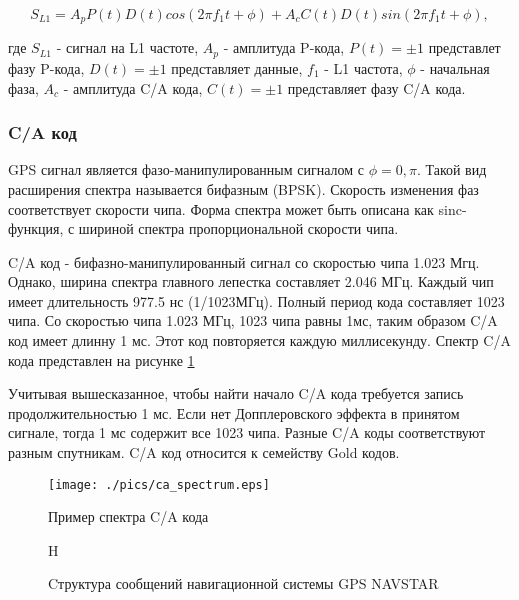 \begin{equation}
S_{L1}=A_p P(t) D(t) cos(2\pi f_1 t + \phi) + A_c C(t) D(t) sin(2\pi f_1 t + \phi),
\label{eq:l2_freq}
\end{equation}

где ${S_{L1}}$ - сигнал на L1 частоте, ${A_p}$ - амплитуда P-кода, ${P(t)=\pm 1}$ представлет фазу P-кода,
${D(t) = \pm 1}$ представляет данные, ${f_1}$ - L1 частота, ${\phi}$ - начальная фаза, ${A_c}$ - амплитуда C/A кода,
${C(t)} = \pm 1$ представляет фазу C/A кода.

\subsubsection{C/A код}
GPS сигнал является фазо-манипулированным сигналом с ${\phi = 0, \pi}$. Такой вид расширения спектра называется бифазным 
(BPSK). Скорость изменения фаз соответствует скорости чипа. Форма спектра может быть описана как sinc-функция,
с шириной спектра пропорциональной скорости чипа. 

C/A код - бифазно-манипулированный сигнал со скоростью чипа 1.023 Мгц. Однако, ширина спектра главного лепестка составляет
2.046 МГц. Каждый чип имеет длительность 977.5 нс (1/1023МГц). Полный период кода составляет 1023 чипа. Со скоростью
чипа 1.023 МГц, 1023 чипа равны 1мс, таким образом C/A код имеет длинну 1 мс. Этот код повторяется каждую миллисекунду.
Спектр C/A кода представлен на рисунке \ref{pic:ca_spectrum}

Учитывая вышесказанное, чтобы найти начало C/A кода требуется запись продолжительностью 1 мс. Если нет Допплеровского
эффекта в принятом сигнале, тогда 1 мс содержит все 1023 чипа. Разные C/A коды соответствуют разным спутникам.
C/A код относится к семейству Gold кодов.

\begin{figure}
\begin{center}
\texttt{[image: ./pics/ca\_spectrum.eps]}
\end{center}
\caption{Пример спектра C/A кода}
\label{pic:ca_spectrum}
\end{figure}

\begin{figure}{H}
\begin{center}
\end{center}
\caption{Cтруктура сообщений навигационной системы GPS NAVSTAR}
\label{pic:gps_data_format}
\end{figure}

